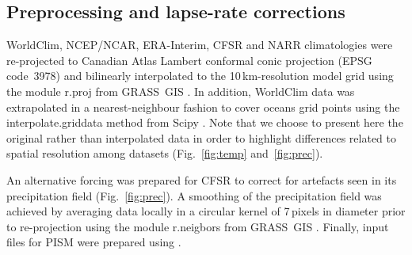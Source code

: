 
\subsection{Preprocessing and lapse-rate corrections}

WorldClim, NCEP/NCAR, ERA-Interim, CFSR and NARR climatologies were re-projected to Canadian Atlas Lambert conformal conic projection (EPSG code~3978) and bilinearly interpolated to the 10\,km-resolution model grid using the module r.proj from GRASS~GIS \citep{soft:grass}. In addition, WorldClim data was extrapolated in a nearest-neighbour fashion to cover oceans grid points using the interpolate.griddata method from Scipy \citep{soft:scipy}. Note that we choose to present here the original rather than interpolated data in order to highlight differences related to spatial resolution among datasets (Fig.~\ref{fig:temp} and~\ref{fig:prec}).

An alternative forcing was prepared for CFSR to correct for artefacts seen in its precipitation field (Fig.~\ref{fig:prec}). A smoothing of the precipitation field was achieved by averaging data locally in a circular kernel of 7\,pixels in diameter prior to re-projection using the module r.neigbors from GRASS~GIS \citep{soft:grass}. Finally, input files for PISM were prepared using \citet{web:nc4py}.
